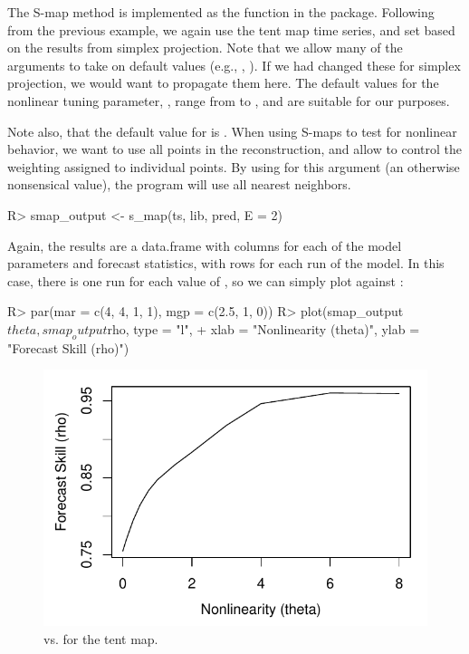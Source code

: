 \documentclass[article]{jss}
\begin{document}
The S-map method is implemented as the function  in the  package. Following from the previous example, we again use the tent map time series, and set  based on the results from simplex projection. Note that we allow many of the arguments to take on default values (e.g., , ). If we had changed these for simplex projection, we would want to propagate them here. The default values for the nonlinear tuning parameter, , range from  to , and are suitable for our purposes.

Note also, that the default value for  is . When using S-maps to test for nonlinear behavior, we want to use all points in the reconstruction, and allow  to control the weighting assigned to individual points. By using  for this argument (an otherwise nonsensical value), the program will use all nearest neighbors.

\begin{Schunk}
\begin{Sinput}
R> smap_output <- s_map(ts, lib, pred, E = 2)
\end{Sinput}
\end{Schunk}

Again, the results are a data.frame with columns for each of the model parameters and forecast statistics, with rows for each run of the model. In this case, there is one run for each value of , so we can simply plot  against :

\begin{Schunk}
\begin{Sinput}
R> par(mar = c(4, 4, 1, 1), mgp = c(2.5, 1, 0))
R> plot(smap_output$theta, smap_output$rho, type = "l",
+       xlab = "Nonlinearity (theta)", ylab = "Forecast Skill (rho)")
\end{Sinput}
\end{Schunk}

\begin{figure}[t!]
\centering
\includegraphics[width=4.5in]{article-smap-theta}
\caption{\label{fig:smap-theta}  vs.  for the tent map.}
\end{figure}
\end{document}
